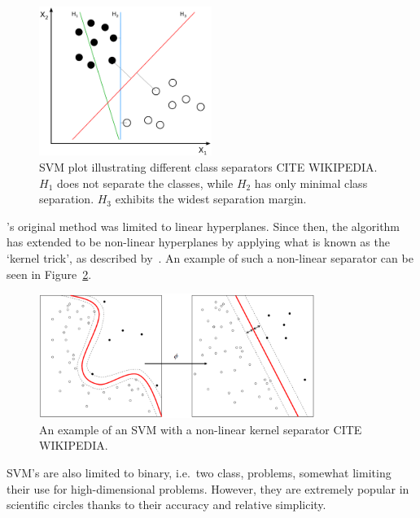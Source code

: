 \begin{figure}
  \centering
  \includegraphics[width=0.5\textwidth]{figures/chapter2/svm_linear}
  \caption[SVM with linear hyperplane.]{SVM plot illustrating different class separators CITE WIKIPEDIA. $H_1$ does not separate the classes, while $H_2$ has only minimal class separation. $H_3$ exhibits the widest separation margin.}
  \label{fig:chap2-svm-linear}
\end{figure}

\citeauthor{vapnik1995support}'s original method was limited to linear hyperplanes. Since then, the algorithm has extended to be non-linear hyperplanes by applying what is known as the `kernel trick', as described by~\cite{amaril1999improving}. An example of such a non-linear separator can be seen in Figure~\ref{fig:chap2-svm-nonlinear}.

\begin{figure}
  \centering
  \includegraphics[width=0.8\textwidth]{figures/chapter2/svm_nonlinear}
  \caption{An example of an SVM with a non-linear kernel separator CITE WIKIPEDIA.}
  \label{fig:chap2-svm-nonlinear}
\end{figure}

SVM's are also limited to  binary, i.e.\ two class, problems, somewhat limiting their use for high-dimensional problems. However, they are extremely popular in scientific circles thanks to their accuracy and relative simplicity. 

